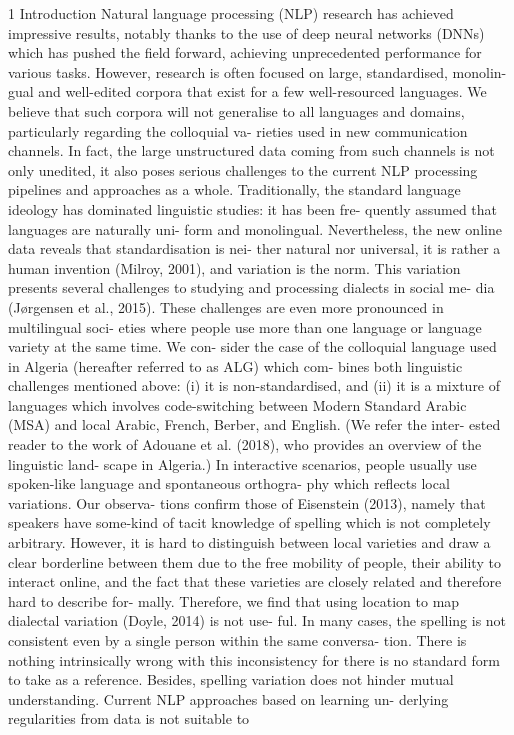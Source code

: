 1 Introduction Natural language processing (NLP) research has achieved impressive results, notably thanks to the use of deep neural networks (DNNs) which has pushed the ﬁeld forward, achieving unprecedented performance for various tasks. However, research is often focused on large, standardised, monolin- gual and well-edited corpora that exist for a few well-resourced languages. We believe that such corpora will not generalise to all languages and domains, particularly regarding the colloquial va- rieties used in new communication channels. In fact, the large unstructured data coming from such channels is not only unedited, it also poses serious challenges to the current NLP processing pipelines and approaches as a whole. Traditionally, the standard language ideology has dominated linguistic studies: it has been fre- quently assumed that languages are naturally uni- form and monolingual. Nevertheless, the new online data reveals that standardisation is nei- ther natural nor universal, it is rather a human invention (Milroy, 2001), and variation is the norm. This variation presents several challenges to studying and processing dialects in social me- dia (Jørgensen et al., 2015). These challenges are even more pronounced in multilingual soci- eties where people use more than one language or language variety at the same time. We con- sider the case of the colloquial language used in Algeria (hereafter referred to as ALG) which com- bines both linguistic challenges mentioned above: (i) it is non-standardised, and (ii) it is a mixture of languages which involves code-switching between Modern Standard Arabic (MSA) and local Arabic, French, Berber, and English. (We refer the inter- ested reader to the work of Adouane et al. (2018), who provides an overview of the linguistic land- scape in Algeria.) In interactive scenarios, people usually use spoken-like language and spontaneous orthogra- phy which reﬂects local variations. Our observa- tions conﬁrm those of Eisenstein (2013), namely that speakers have some-kind of tacit knowledge of spelling which is not completely arbitrary. However, it is hard to distinguish between local varieties and draw a clear borderline between them due to the free mobility of people, their ability to interact online, and the fact that these varieties are closely related and therefore hard to describe for- mally. Therefore, we ﬁnd that using location to map dialectal variation (Doyle, 2014) is not use- ful. In many cases, the spelling is not consistent even by a single person within the same conversa- tion. There is nothing intrinsically wrong with this inconsistency for there is no standard form to take as a reference. Besides, spelling variation does not hinder mutual understanding. Current NLP approaches based on learning un- derlying regularities from data is not suitable to

